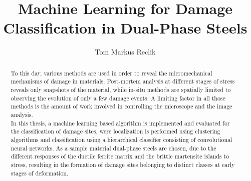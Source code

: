 \documentclass[12pt,a4paper]{report}
\title{Machine Learning for Damage Classification in Dual-Phase Steels}
\author{Tom Markus Reclik}
\begin{document}
\maketitle
\begin{abstract}
To this day, various methods are used in order to reveal the micromechanical mechanisms of damage in materials. Post-mortem analysis at different stages of stress reveals only snapshots of the material, while in-situ methods are spatially limited to observing the evolution of only a few damage events. A limiting factor in all those methods is the amount of work involved in controlling the microscope and the image analysis. \\

In this thesis, a machine learning based algorithm is implemented and evaluated for the classification of damage sites, were localization is performed using clustering algorithms and classification using a hierarchical classifier consisting of convolutional neural networks. As a sample material dual-phase steels are chosen, due to the different responses of the ductile ferrite matrix and the brittle martensite islands to stress, resulting in the formation of damage sites belonging to distinct classes at early stages of deformation. \\




\end{abstract}
\end{document}
